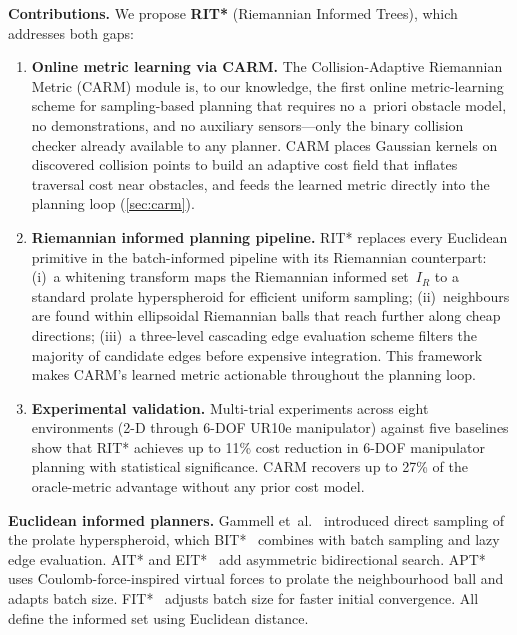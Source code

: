 \documentclass[journal]{IEEEtran}
\newcommand{\IR}{I_{\!R}}
\begin{document}
\textbf{Contributions.}
We propose \textbf{RIT*} (Riemannian Informed Trees), which addresses
both gaps:
\begin{enumerate}
  \item \textbf{Online metric learning via CARM.}
    The Collision-Adaptive Riemannian Metric (CARM) module is, to our
    knowledge, the first online metric-learning scheme for
    sampling-based planning that requires no a~priori obstacle model,
    no demonstrations, and no auxiliary sensors---only the binary
    collision checker already available to any planner.
    CARM places Gaussian kernels on discovered collision points to
    build an adaptive cost field that inflates traversal cost near
    obstacles, and feeds the learned metric directly into the planning
    loop (\cref{sec:carm}).

  \item \textbf{Riemannian informed planning pipeline.}
    RIT* replaces every Euclidean primitive in the batch-informed
    pipeline with its Riemannian counterpart:
    (i)~a whitening transform maps the Riemannian informed
    set~$\IR$ to a standard prolate hyperspheroid for efficient
    uniform sampling;
    (ii)~neighbours are found within ellipsoidal Riemannian balls
    that reach further along cheap directions;
    (iii)~a three-level cascading edge evaluation scheme filters
    the majority of candidate edges before expensive integration.
    This framework makes CARM's learned metric actionable throughout
    the planning loop.

  \item \textbf{Experimental validation.}
    Multi-trial experiments across eight environments (2-D through
    6-DOF UR10e manipulator) against five baselines show that RIT*
    achieves up to 11\% cost reduction in 6-DOF manipulator
    planning with statistical significance.
    CARM recovers up to 27\% of the oracle-metric advantage
    without any prior cost model.
\end{enumerate}

\textbf{Euclidean informed planners.}
Gammell et~al.~\cite{Gammell2018} introduced direct sampling of the
prolate hyperspheroid, which BIT*~\cite{Gammell2020} combines with
batch sampling and lazy edge evaluation.
AIT* and EIT*~\cite{Strub2022} add asymmetric bidirectional search.
APT*~\cite{APT2025} uses Coulomb-force-inspired virtual forces to
prolate the neighbourhood ball and adapts batch size.
FIT*~\cite{FIT2024} adjusts batch size for faster initial convergence.
All define the informed set using Euclidean distance.
\end{document}
